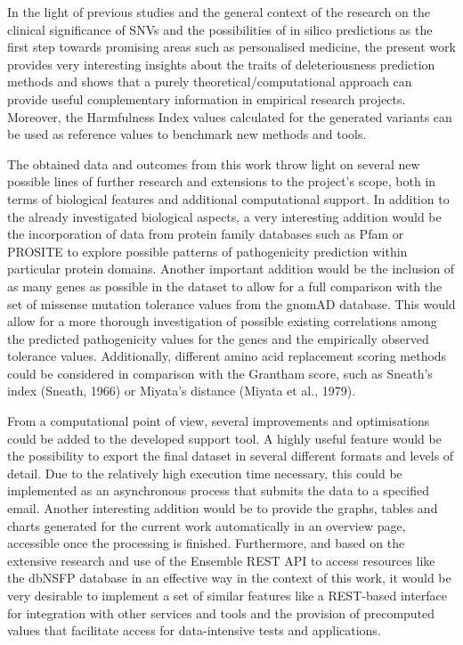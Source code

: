 \documentclass[12pt,MSc,wordcount,anon]{muthesis}
\begin{document}
\begin{flushleft}
In the light of previous studies and the general context of the research on the clinical significance of SNVs and the possibilities of in silico predictions as the first step towards promising areas such as personalised medicine, the present work provides very interesting insights about the traits of deleteriousness prediction methods and shows that a purely theoretical/computational approach can provide useful complementary information in empirical research projects. Moreover, the Harmfulness Index values calculated for the generated variants can be used as reference values to benchmark new methods and tools.

The obtained data and outcomes from this work throw light on several new possible lines of further research and extensions to the project's scope, both in terms of biological features and additional computational support. In addition to the already investigated biological aspects, a very interesting addition would be the incorporation of data from protein family databases such as Pfam or PROSITE to explore possible patterns of pathogenicity prediction within particular protein domains. Another important addition would be the inclusion of as many genes as possible in the dataset to allow for a full comparison with the set of missense mutation tolerance values from the gnomAD database. This would allow for a more thorough investigation of possible existing correlations among the predicted pathogenicity values for the genes and the empirically observed tolerance values. Additionally, different amino acid replacement scoring methods could be considered in comparison with the Grantham score, such as Sneath's index (Sneath, 1966) or Miyata's distance (Miyata et al., 1979). 

From a computational point of view, several improvements and optimisations could be added to the developed support tool. A highly useful feature would be the possibility to export the final dataset in several different formats and levels of detail. Due to the relatively high execution time necessary, this could be implemented as an asynchronous process that submits the data to a specified email. Another interesting addition would be to provide the graphs, tables and charts generated for the current work automatically in an overview page, accessible once the processing is finished. Furthermore, and based on the extensive research and use of the Ensemble REST API to access resources like the dbNSFP database in an effective way in the context of this work, it would be very desirable to implement a set of similar features like a REST-based interface for integration with other services and tools and the provision of precomputed values that facilitate access for data-intensive tests and applications.


\end{flushleft}
\end{document}

